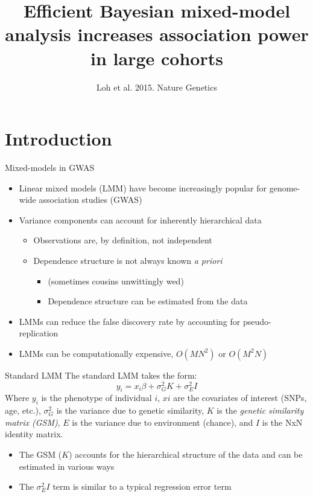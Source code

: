 \documentclass[aspectratio=169]{beamer}\usepackage[]{graphicx}\usepackage[]{color}
\title[Bayesian Mixed Models]{Efficient Bayesian mixed-model analysis increases association power in large cohorts}
\author[Dominic LaRoche]{Loh et al. 2015.  Nature Genetics}
\begin{document}
\maketitle

\section{Introduction}
\begin{frame}{Mixed-models in GWAS}
\begin{itemize}
\item Linear mixed models (LMM) have become increasingly popular for genome-wide association studies (GWAS)
\pause
\item Variance components can account for inherently hierarchical data
\pause
\begin{itemize}
\item Observations are, by definition, not independent
\item Dependence structure is not always known \emph{a priori}
\begin{itemize}
\item \small{(sometimes cousins unwittingly wed)}
\item Dependence structure can be estimated from the data
\end{itemize}
\end{itemize}
\pause
\item LMMs can reduce the false discovery rate by accounting for pseudo-replication
\pause
\item LMMs can be computationally expensive, $O(MN^2)$ or $O(M^2N)$
\end{itemize}
\end{frame}

\begin{frame}{Standard LMM}
The standard LMM takes the form:
$$y_i = x_{i}\beta + \sigma^2_GK + \sigma^2_EI$$
Where $y_i$ is the phenotype of individual $i$, $x{i}$ are the covariates of interest (SNPs, age, etc.), $\sigma^2_G$ is the variance due to genetic similarity, $K$ is the \emph{genetic similarity matrix (GSM)}, $E$ is the variance due to environment (chance), and $I$ is the NxN identity matrix.

\begin{itemize}
\item The GSM ($K$) accounts for the hierarchical structure of the data and can be estimated in various ways
\item The $ \sigma^2_EI$ term is similar to a typical regression error term
\end{itemize}
\end{frame}
\end{document}
